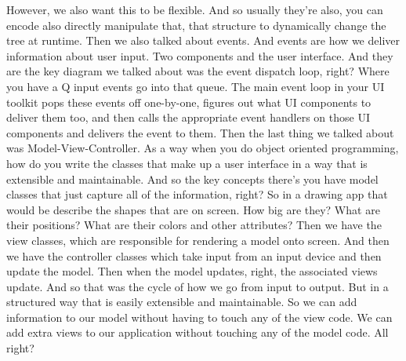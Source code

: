 However, we also want this to be flexible. And so usually they're also, you can encode also directly manipulate that, that structure to dynamically change the tree at runtime. Then we also talked about events. And events are how we deliver information about user input. Two components and the user interface. And they are the key diagram we talked about was the event dispatch loop, right? Where you have a Q input events go into that queue. The main event loop in your UI toolkit pops these events off one-by-one, figures out what UI components to deliver them too, and then calls the appropriate event handlers on those UI components and delivers the event to them. Then the last thing we talked about was Model-View-Controller. As a way when you do object oriented programming, how do you write the classes that make up a user interface in a way that is extensible and maintainable. And so the key concepts there's you have model classes that just capture all of the information, right? So in a drawing app that would be describe the shapes that are on screen. How big are they? What are their positions? What are their colors and other attributes? Then we have the view classes, which are responsible for rendering a model onto screen. And then we have the controller classes which take input from an input device and then update the model. Then when the model updates, right, the associated views update. And so that was the cycle of how we go from input to output. But in a structured way that is easily extensible and maintainable. So we can add information to our model without having to touch any of the view code. We can add extra views to our application without touching any of the model code. All right? 

